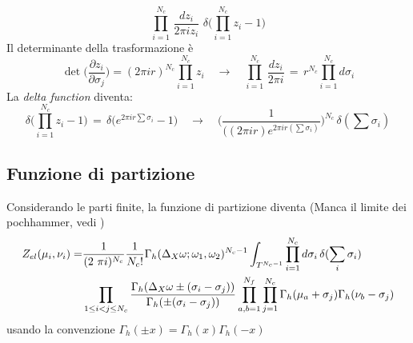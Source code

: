 \documentclass[a4paper,12pt]{article}
\begin{document}
$$
\prod_{i=1}^{N_c} \, \frac{dz_i}{2 \pi i z_i} \, \, \delta \big( \prod_{i=1}^{N_c} z_i - 1 \big)
$$
Il determinante della trasformazione è
$$
  \det \big (\frac{ \partial z_i }{ \partial \sigma_j})= (2 \pi i r)^{N_c} \prod_{i=1}^{N_c}  z_i \quad \longrightarrow \quad \prod_{i=1}^{N_c} \, \frac{dz_i}{2 \pi i} \, = \, r^{N_c} \prod_{i=1}^{N_c} d \sigma_i
$$
La \emph{delta function} diventa:
\begin{equation}
\delta \big( \prod_{i=1}^{N_c} z_i - 1 \big) \, = \, \delta \big(e^{2 \pi i r \sum \sigma_i} - 1 \big) \quad \longrightarrow \quad  \bigg( \frac{1}{ ((2 \pi i r) e^{2 \pi i r (\sum \sigma_i)}} \bigg)^{N_c} \, \delta ( \sum \sigma_i)
 \end{equation}
\begin{comment}
		 Si può capire il risultato della delta function come un ulteriore cambio di variabile fra le $\sigma_i$:
 	\begin{align*}
 	 \sigma_i \rightarrow \tilde{\sigma_i} \qquad \mbox{per} \qquad i= 1 \ldots N-1 \qquad \sigma_N \rightarrow \tilde{\sigma_N} = S = \sum_{i=1}^{N} \sigma_i \\
 	  Det(J) = Det \bigg( \frac{\partial \sigma_i}{\partial \tilde{\sigma_j} } \bigg) \; = \;
 	   \begin{pmatrix}[c c c  c|c]
			1 	& 0 		& 0 & \cdots & 0 \\
			0 			 & 1 & 0 & \cdots &  \vdots \\
			\vdots 		& 0 		& \ddots & 0 & \vdots \\
			\vdots & \vdots & 0 & 1 & 0 \\
			\hline
			1 & \cdots & \cdots & 1  &1 \\
	\end{pmatrix}
	\end{align*}
\end{comment}

\subsection{Funzione di partizione}
Considerando le parti finite, la funzione di partizione diventa
(Manca il limite dei pochhammer, vedi \citep{Spiridonov:2009za})
\begin{align*}
Z_{el} ( \mu_i , \nu_i ) = &
 \frac{1}{ (2 \ \pi i)^{N_c} }{1 \over N_c ! }
\Gamma_h ( \Delta_X \omega ; \omega_1 , \omega_2)^{N_c-1}
\int_{T^{N_c-1}}
\prod_{i=1}^{N_c} d \sigma_i \, \delta( \sum_i \sigma_i) \, \\
 &  \prod_{ 1 \leq i<j \leq N_c} \frac{ \Gamma_h( \Delta_X \omega \pm (\sigma_i - \sigma_j)) }{ \Gamma_h ( \pm (\sigma_i - \sigma_j) )}
 \prod_{a,b=1}^{N_f} \prod_{j=1}^{N_c} \Gamma_h ( \mu_a + \sigma_j) \Gamma_h ( \nu_b - \sigma_j)
\end{align*}
usando la convenzione $ \Gamma_h ( \pm x ) = \Gamma_h (x) \Gamma_h( -x)$
\end{document}
